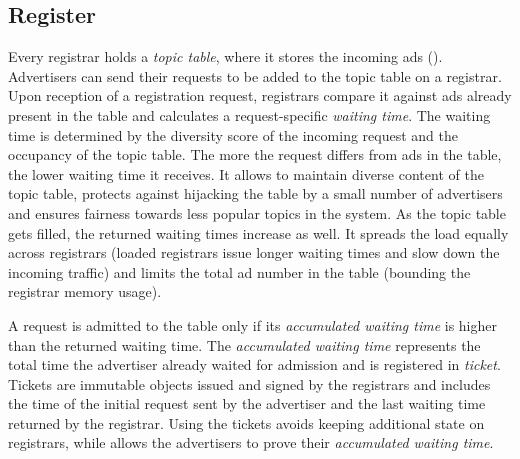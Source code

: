 




\iffalse
\subsection{Register}
Every registrar holds a \emph{topic table}, where it stores the incoming ads (). Advertisers can send their requests to be added to the topic table on a registrar. Upon reception of a registration request, registrars compare it against ads already present in the table and calculates a request-specific \emph{waiting time}. The waiting time is determined by the diversity score of the incoming request and the occupancy of the topic table.  The more the request differs from ads in the table, the lower waiting time it receives. It allows to maintain diverse content of the topic table, protects against hijacking the table by a small number of advertisers and ensures fairness towards less popular topics in the system. As the topic table gets filled, the returned waiting times increase as well. It spreads the load equally across registrars (loaded registrars issue longer waiting times and slow down the incoming traffic) and limits the total ad number in the table (bounding the registrar memory usage). 

A request is admitted to the table only if its \emph{accumulated waiting time} is higher than the returned waiting time. The \emph{accumulated waiting time} represents the total time the advertiser already waited for admission and is registered in \emph{ticket}. Tickets are immutable objects issued and signed by the registrars and includes the time of the initial request sent by the advertiser and the last waiting time returned by the registrar. Using the tickets avoids keeping additional state on registrars, while allows the advertisers to prove their \emph{accumulated waiting time}. 

